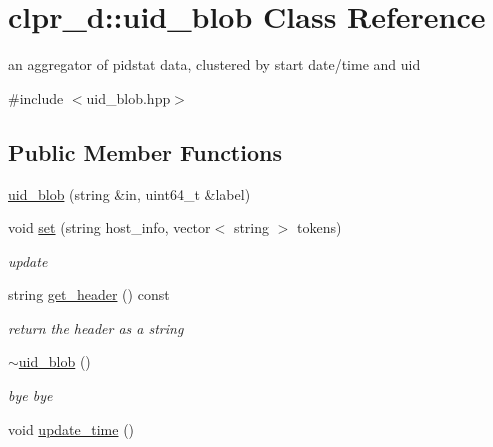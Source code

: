 \hypertarget{classclpr__d_1_1uid__blob}{\section{clpr\-\_\-d\-:\-:uid\-\_\-blob \-Class \-Reference}
\label{classclpr__d_1_1uid__blob}
}


an aggregator of pidstat data, clustered by start date/time and uid  




{\ttfamily \#include $<$uid\-\_\-blob.\-hpp$>$}

\subsection*{\-Public \-Member \-Functions}
\begin{DoxyCompactItemize}
\item 
\hyperlink{classclpr__d_1_1uid__blob_a5b4351c88ea3a746b729e3582c8e963f}{uid\-\_\-blob} (string \&in, uint64\-\_\-t \&label)
\item 
void \hyperlink{classclpr__d_1_1uid__blob_a9a18a8c14ea1fff4c0773a98b2dcb797}{set} (string host\-\_\-info, vector$<$ string $>$ tokens)
\begin{DoxyCompactList}\small\item\em update \end{DoxyCompactList}\item 
\hypertarget{classclpr__d_1_1uid__blob_a035e471fc7c8c48ad1bfe2677f34a017}{string \hyperlink{classclpr__d_1_1uid__blob_a035e471fc7c8c48ad1bfe2677f34a017}{get\-\_\-header} () const }\label{classclpr__d_1_1uid__blob_a035e471fc7c8c48ad1bfe2677f34a017}

\begin{DoxyCompactList}\small\item\em return the header as a string \end{DoxyCompactList}\item 
\hypertarget{classclpr__d_1_1uid__blob_abb25f04e073d67e6db3ba7146415805a}{\hyperlink{classclpr__d_1_1uid__blob_abb25f04e073d67e6db3ba7146415805a}{$\sim$uid\-\_\-blob} ()}\label{classclpr__d_1_1uid__blob_abb25f04e073d67e6db3ba7146415805a}

\begin{DoxyCompactList}\small\item\em bye bye \end{DoxyCompactList}\item 
\hypertarget{classclpr__d_1_1uid__blob_a0f99f0f7dcaca41d3960edb99f2718a8}{void \hyperlink{classclpr__d_1_1uid__blob_a0f99f0f7dcaca41d3960edb99f2718a8}{update\-\_\-time} ()}\label{classclpr__d_1_1uid__blob_a0f99f0f7dcaca41d3960edb99f2718a8}


\end{DoxyCompactItemize}
